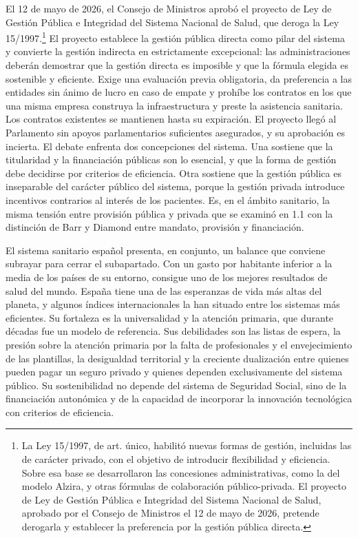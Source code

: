 \documentclass[10pt,a4paper]{article}
\begin{document}
El 12 de mayo de 2026, el Consejo de Ministros aprobó el proyecto de Ley de Gestión Pública e Integridad del Sistema Nacional de Salud, que deroga la Ley 15/1997.\footnote{%
    La Ley 15/1997, de art. único, habilitó nuevas formas de gestión, incluidas las de carácter privado, con el objetivo de introducir flexibilidad y eficiencia. Sobre esa base se desarrollaron las concesiones administrativas, como la del modelo Alzira, y otras fórmulas de colaboración público-privada. El proyecto de Ley de Gestión Pública e Integridad del Sistema Nacional de Salud, aprobado por el Consejo de Ministros el 12 de mayo de 2026, pretende derogarla y establecer la preferencia por la gestión pública directa.
} El proyecto establece la gestión pública directa como pilar del sistema y convierte la gestión indirecta en estrictamente excepcional: las administraciones deberán demostrar que la gestión directa es imposible y que la fórmula elegida es sostenible y eficiente. Exige una evaluación previa obligatoria, da preferencia a las entidades sin ánimo de lucro en caso de empate y prohíbe los contratos en los que una misma empresa construya la infraestructura y preste la asistencia sanitaria. Los contratos existentes se mantienen hasta su expiración. El proyecto llegó al Parlamento sin apoyos parlamentarios suficientes asegurados, y su aprobación es incierta. El debate enfrenta dos concepciones del sistema. Una sostiene que la titularidad y la financiación públicas son lo esencial, y que la forma de gestión debe decidirse por criterios de eficiencia. Otra sostiene que la gestión pública es inseparable del carácter público del sistema, porque la gestión privada introduce incentivos contrarios al interés de los pacientes. Es, en el ámbito sanitario, la misma tensión entre provisión pública y privada que se examinó en 1.1 con la distinción de Barr y Diamond entre mandato, provisión y financiación.

El sistema sanitario español presenta, en conjunto, un balance que conviene subrayar para cerrar el subapartado. Con un gasto por habitante inferior a la media de los países de su entorno, consigue uno de los mejores resultados de salud del mundo. España tiene una de las esperanzas de vida más altas del planeta, y algunos índices internacionales la han situado entre los sistemas más eficientes. Su fortaleza es la universalidad y la atención primaria, que durante décadas fue un modelo de referencia. Sus debilidades son las listas de espera, la presión sobre la atención primaria por la falta de profesionales y el envejecimiento de las plantillas, la desigualdad territorial y la creciente dualización entre quienes pueden pagar un seguro privado y quienes dependen exclusivamente del sistema público. Su sostenibilidad no depende del sistema de Seguridad Social, sino de la financiación autonómica y de la capacidad de incorporar la innovación tecnológica con criterios de eficiencia.
\end{document}
